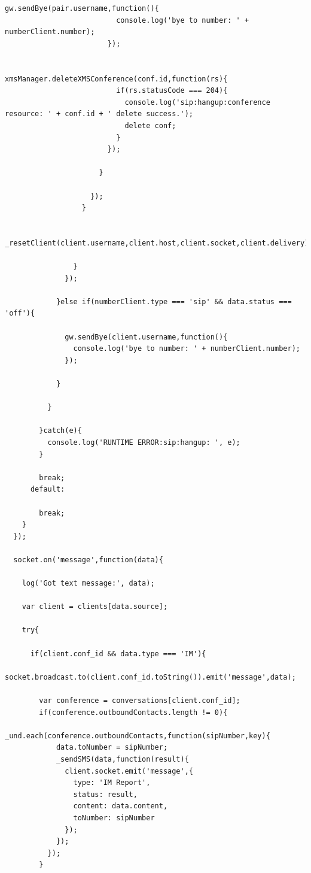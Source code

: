 \begin{appendices}
\begin{lstlisting}[caption={socket.js on Application Server},label={code:server_socket}]
                        gw.sendBye(pair.username,function(){
                          console.log('bye to number: ' + numberClient.number);
                        });

                        xmsManager.deleteXMSConference(conf.id,function(rs){
                          if(rs.statusCode === 204){
                            console.log('sip:hangup:conference resource: ' + conf.id + ' delete success.');
                            delete conf;
                          }
                        });

                      }
                      
                    });
                  }

                  _resetClient(client.username,client.host,client.socket,client.delivery);

                }
              });

            }else if(numberClient.type === 'sip' && data.status === 'off'){

              gw.sendBye(client.username,function(){
                console.log('bye to number: ' + numberClient.number);
              });

            }

          }

        }catch(e){
          console.log('RUNTIME ERROR:sip:hangup: ', e);
        }

        break;
      default:
        
        break;
    }
  });

  socket.on('message',function(data){

    log('Got text message:', data);

    var client = clients[data.source];

    try{

      if(client.conf_id && data.type === 'IM'){
        socket.broadcast.to(client.conf_id.toString()).emit('message',data);

        var conference = conversations[client.conf_id];
        if(conference.outboundContacts.length != 0){
          _und.each(conference.outboundContacts,function(sipNumber,key){
            data.toNumber = sipNumber;
            _sendSMS(data,function(result){
              client.socket.emit('message',{
                type: 'IM Report',
                status: result,
                content: data.content,
                toNumber: sipNumber
              });
            });
          });
        }


\end{lstlisting}
\end{appendices}
